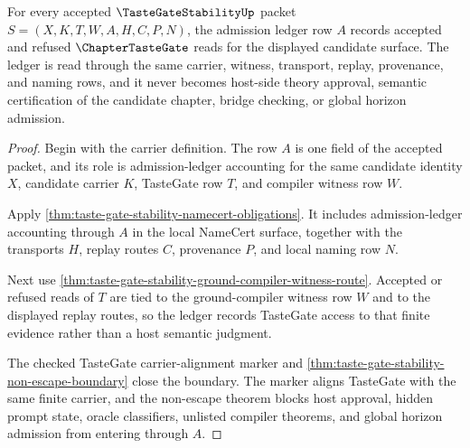 \begin{theorem}
\label{thm:taste-gate-stability-admission-ledger-obligation}
For every accepted $\TasteGateStabilityUp$ packet $S=(X,K,T,W,A,H,C,P,N)$, the admission ledger row $A$ records accepted and refused $\ChapterTasteGate$ reads for the displayed candidate surface. The ledger is read through the same carrier, witness, transport, replay, provenance, and naming rows, and it never becomes host-side theory approval, semantic certification of the candidate chapter, bridge checking, or global horizon admission.
\end{theorem}
\begin{proof}
Begin with the carrier definition. The row $A$ is one field of the accepted packet, and its role is admission-ledger accounting for the same candidate identity $X$, candidate carrier $K$, TasteGate row $T$, and compiler witness row $W$.

Apply \autoref{thm:taste-gate-stability-namecert-obligations}. It includes admission-ledger accounting through $A$ in the local NameCert surface, together with the transports $H$, replay routes $C$, provenance $P$, and local naming row $N$.

Next use \autoref{thm:taste-gate-stability-ground-compiler-witness-route}. Accepted or refused reads of $T$ are tied to the ground-compiler witness row $W$ and to the displayed replay routes, so the ledger records TasteGate access to that finite evidence rather than a host semantic judgment.

The checked TasteGate carrier-alignment marker and \autoref{thm:taste-gate-stability-non-escape-boundary} close the boundary. The marker aligns TasteGate with the same finite carrier, and the non-escape theorem blocks host approval, hidden prompt state, oracle classifiers, unlisted compiler theorems, and global horizon admission from entering through $A$.
\end{proof}

